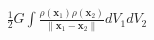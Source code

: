 \documentclass[preview]{standalone}
\begin{document}
\begin{align*}
\frac{1}{2}G\int\frac{\rho(\mathbf x_1)\rho(\mathbf x_2)}{\|\mathbf x_1-\mathbf x_2\|}dV_1dV_2
\end{align*}
\end{document}
